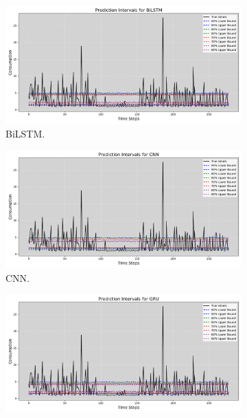 \begin{figure}[H]
    \centering
        \begin{minipage}{0.6\textwidth}
            \centering
            \begin{subfigure}[b]{1.0\textwidth}
                \centering
                \includegraphics[width=\textwidth]{Chap02/figs/Prediction_Intervals_Styled_BiLSTM_Electricity_Consumption.png}
                \caption{BiLSTM.}
            \end{subfigure}
            \hfill
            \begin{subfigure}[b]{1.0\textwidth}
                \centering
                \includegraphics[width=\textwidth]{Chap02/figs/Prediction_Intervals_Styled_CNN_Electricity_Consumption.png}
                \caption{CNN.}
            \end{subfigure}
            \begin{subfigure}[b]{1.0\textwidth}
                \centering
                \includegraphics[width=\textwidth]{Chap02/figs/Prediction_Intervals_Styled_GRU_Electricity_Consumption.png}

\end{subfigure}
\end{minipage}
\end{figure}
